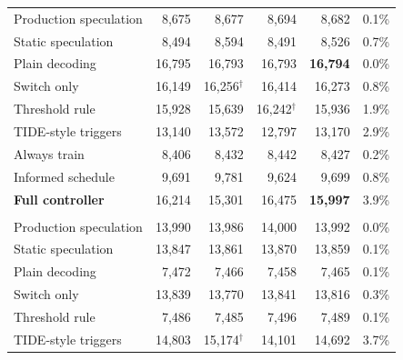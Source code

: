 \documentclass{article}
\begin{document}
\begin{table}[!htbp]
\begin{tabular}{@{}lrrrrr@{}}
Production speculation
& 8{,}675 & 8{,}677 & 8{,}694
& 8{,}682 & 0.1\% \\

Static speculation
& 8{,}494 & 8{,}594 & 8{,}491
& 8{,}526 & 0.7\% \\

Plain decoding
& 16{,}795 & 16{,}793 & 16{,}793
& \cellcolor{tabBest}\textbf{16{,}794}
& 0.0\% \\

Switch only
& 16{,}149 & 16{,}256$^\dagger$ & 16{,}414
& 16{,}273 & 0.8\% \\

Threshold rule
& 15{,}928 & 15{,}639 & 16{,}242$^\dagger$
& 15{,}936 & 1.9\% \\

TIDE-style triggers
& 13{,}140 & 13{,}572 & 12{,}797
& 13{,}170 & 2.9\% \\

Always train
& 8{,}406 & 8{,}432 & 8{,}442
& 8{,}427 & 0.2\% \\

Informed schedule
& 9{,}691 & 9{,}781 & 9{,}624
& 9{,}699 & 0.8\% \\

\rowcolor{tabFull}
\textbf{Full controller}
& 16{,}214 & 15{,}301 & 16{,}475
& \textbf{15{,}997} & 3.9\% \\

\addlinespace[4pt]

\rowcolor{tabGroup}
\multicolumn{6}{@{}l@{}}{%
  \textbf{Qwen3-30B-A3B (MoE) -- Code}
} \\

Production speculation
& 13{,}990 & 13{,}986 & 14{,}000
& 13{,}992 & 0.0\% \\

Static speculation
& 13{,}847 & 13{,}861 & 13{,}870
& 13{,}859 & 0.1\% \\

Plain decoding
& 7{,}472 & 7{,}466 & 7{,}458
& 7{,}465 & 0.1\% \\

Switch only
& 13{,}839 & 13{,}770 & 13{,}841
& 13{,}816 & 0.3\% \\

Threshold rule
& 7{,}486 & 7{,}485 & 7{,}496
& 7{,}489 & 0.1\% \\

TIDE-style triggers
& 14{,}803 & 15{,}174$^\dagger$ & 14{,}101
& 14{,}692 & 3.7\% \\


\end{tabular}
\end{table}
\end{document}
